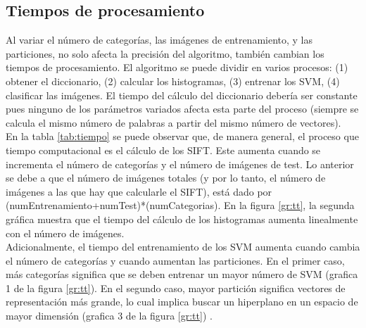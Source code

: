 \documentclass[10pt,twocolumn,letterpaper]{article}
\begin{document}
\subsection{Tiempos de procesamiento}
Al variar el número de categorías, las imágenes de entrenamiento, y las particiones, no solo afecta la precisión del algoritmo, también cambian los tiempos de procesamiento. El algoritmo se puede dividir en varios procesos: (1) obtener el diccionario, (2) calcular los histogramas, (3) entrenar los SVM, (4) clasificar las imágenes. El tiempo del cálculo del diccionario debería ser constante pues ninguno de los parámetros variados afecta esta parte del proceso (siempre se calcula el mismo número de palabras a partir del mismo número de vectores). \\
En la tabla \ref{tab:tiempo} se puede observar que, de manera general, el proceso que tiempo computacional es el cálculo de los SIFT. Este aumenta cuando se incrementa el número de categorías y el número de imágenes de test. Lo anterior se debe a que el número de imágenes totales (y por lo tanto, el número de imágenes a las que hay que calcularle el SIFT), está dado por (numEntrenamiento+numTest)*(numCategorias). En la figura \ref{gr:tt}, la segunda gráfica muestra que el tiempo del cálculo de los histogramas aumenta linealmente con el número de imágenes.\\
Adicionalmente, el tiempo del entrenamiento de los SVM aumenta cuando cambia el número de categorías y cuando aumentan las particiones. En el primer caso, más categorías significa que se deben entrenar un mayor número de SVM (grafica 1 de la figura \ref{gr:tt}). En el segundo caso, mayor partición significa vectores de representación más grande, lo cual implica buscar un hiperplano en un espacio de mayor dimensión (grafica 3 de la figura \ref{gr:tt}) .\\
\end{document}
